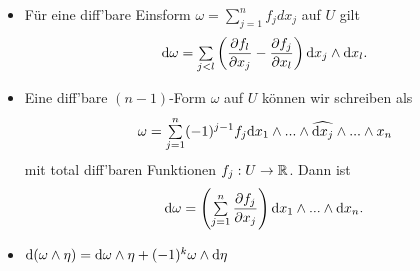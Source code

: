 \documentclass{cheat-sheet}
\theoremstyle{definition}
\let\myBinom\binom
\renewcommand{\binom}[2]{\mathsmaller{\myBinom{#1}{#2}}}
\begin{document}
\iffalse
\begin{bsp}
  Für $k = 1$: $\omega = \sum_{j = 1}^n f_j \d x_j$
  $\d \omega = \sum_{j=1}^n \d f_j \wedge \d x_j = \sum_{j=1}^n (\sum_{k=1}^n \frac{\partial f_j}{\partial x_k} \d x_k) \wedge \d x_j = \sum_{j=1}^k (\frac{\partial f_j}{\partial x_k} - \frac{\partial f_k}{\partial x_j}) \d x_k \wedge \d x_j$.

  $k = n -1$: $\mathrm{dim}(\Lambda^{n-1} V^*) = \binom{n}{n-1} = n = \mathrm{dim}(V)$
  $\Set{ (-1)^{j-1} \d x_1(u) \wedge ... \wedge \widehat{\d x_j(u)} \wedge ... \wedge \d x_n(u) }{ 1 \leq j \leq n }$ ist für alle $u \in U$ eine Basis von $\Lambda^{n-1} T_u^* U$.

  $\omega = \sum_{j=1}^n (-1)^{j-1} f_j \d x_1 \wedge ... \wedge \widehat{\d x_j} \wedge ... \wedge \d x_n$
  $\d \omega = \sum_{j=1}^n (-1)^{j-1} \d f_j \wedge \d x_1 \wedge ... \wedge \widehat{\d x_j} \wedge ... \wedge \d x_n = \begin{cases} 0, & \text{falls} j \not= k \\ \d x_1 \wedge ... \wedge \d x_n & j = k \end{cases}$
\end{bsp}
\fi

\begin{bem}
  \begin{itemize}
    \item Für eine diff'bare Einsform $\omega = \sum_{j=1}^n f_j dx_j$ auf $U$ gilt
    \[ \d \omega = \sum_{j<l} \left( \frac{\partial f_l}{\partial x_j} - \frac{\partial f_j}{\partial x_l} \right) \d x_j \wedge \d x_l. \]
    \item Eine diff'bare $(n{-}1)$-Form $\omega$ auf $U$ können wir schreiben als
    \[ \omega = \sum_{j=1}^n (-1)^{j-1} f_j \d x_1 \wedge ... \wedge \widehat{\d x_j} \wedge ... \wedge x_n \]
    mit total diff'baren Funktionen $f_j : U \to \mathbb{R}$. Dann ist
    \[ \d \omega = \left( \sum_{j=1}^n \frac{\partial f_j}{\partial x_j} \right) \d x_1 \wedge ... \wedge \d x_n. \]
  \end{itemize}
\end{bem}

\begin{satz}%
  \begin{itemize}
    \item $\mathrm{d} (\omega \wedge \eta) = \mathrm{d} \omega \wedge \eta + (-1)^k \omega \wedge \mathrm{d} \eta$
  \end{itemize}
\end{satz}
\end{document}

